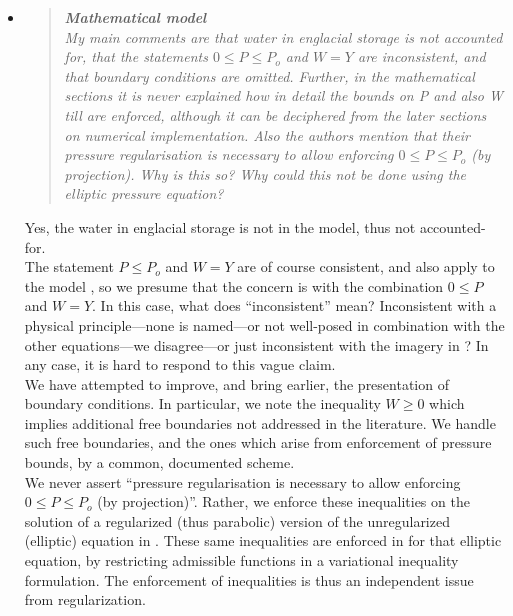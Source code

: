 \documentclass[11pt,reqno]{amsart}
\newcommand{\reply}[2]{
\medskip\medskip
\item  \begin{quote}
\emph{#1}
\end{quote}

\medskip
\noindent #2}
\begin{document}
\begin{itemize}
\reply{\textbf{Mathematical model}\\
My main comments are that water in englacial storage is not accounted for, that the statements $0 \le P \le P_o$ and $W = Y$ are inconsistent, and that boundary conditions are omitted. Further, in the mathematical sections it is never explained how in detail the bounds on P and also W till are enforced, although it can be deciphered from the later sections on numerical implementation. Also the authors mention that their pressure regularisation is necessary to allow enforcing $0 \le P \le P_o$ (by projection).  Why is this so? Why could this not be done using the elliptic pressure equation?}
{Yes, the water in englacial storage is not in the model, thus not accounted-for. \\
\indent The statement $P\le P_o$ and $W=Y$ are of course consistent, and also apply to the model \cite{Schoofetal2012}, so we presume that the concern is with the combination $0\le P$ and $W=Y$.  In this case, what does ``inconsistent'' mean?  Inconsistent with a physical principle---none is named---or not well-posed in combination with the other equations---we disagree---or just inconsistent with the imagery in \cite{Schoofetal2012}?  In any case, it is hard to respond to this vague claim.\\
\indent We have attempted to improve, and bring earlier, the presentation of boundary conditions.  In particular, we note the inequality $W\ge 0$ which implies additional free boundaries not addressed in the literature.  We handle such free boundaries, and the ones which arise from enforcement of pressure bounds, by a common, documented scheme.\\
\indent We never assert ``pressure regularisation is necessary to allow enforcing $0 \le P \le P_o$ (by projection)''.  Rather, we enforce these inequalities on the solution of a regularized (thus parabolic) version of the unregularized (elliptic) equation in \cite{Schoofetal2012}.  These same inequalities are enforced in \cite{Schoofetal2012} for that elliptic equation, by restricting admissible functions in a variational inequality formulation.  The enforcement of inequalities is thus an independent issue from regularization.}


\end{itemize}
\end{document}
